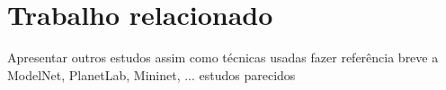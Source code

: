 
\section{Trabalho relacionado} \label{relac}

{ \color{blue} Apresentar outros estudos assim como técnicas usadas
fazer referência breve a ModelNet, PlanetLab, Mininet, ... estudos parecidos}